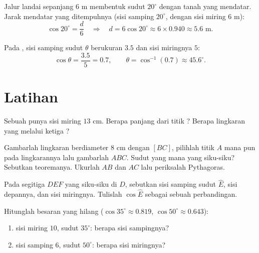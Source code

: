 \begin{example}\label{ex:g8:cosine:side}
Jalur landai sepanjang $6$ m membentuk sudut $20^\circ$ dengan tanah
yang mendatar. Jarak mendatar yang ditempuhnya (sisi samping
$20^\circ$, dengan sisi miring $6$ m):
\[
\cos 20^\circ = \frac{d}{6}
\quad\Longrightarrow\quad
d = 6 \cos 20^\circ \approx 6 \times 0.940 \approx 5.6 \text{ m}.
\]
\end{example}

\begin{example}\label{ex:g8:cosine:angle}
Pada , sisi samping sudut $\theta$ berukuran
$3.5$ dan sisi miringnya $5$:
\[
\cos\theta = \frac{3.5}{5} = 0.7,
\qquad
\theta = \cos^{-1}(0.7) \approx 45.6^\circ .
\]
\end{example}

\section{Latihan}

\begin{exercise}[$\star$]\label{exo:g8:cosine:1}
Sebuah  punya sisi miring $13$ cm. Berapa panjang
 dari titik ? Berapa  lingkaran
yang melalui ketiga ?
\end{exercise}

\begin{exercise}[$\star$]\label{exo:g8:cosine:2}
Gambarlah lingkaran berdiameter $8$ cm dengan  $[BC]$,
pilihlah titik $A$ mana pun pada lingkarannya lalu gambarlah $ABC$.
Sudut yang mana yang siku-siku? Sebutkan teoremanya. Ukurlah $AB$ dan
$AC$ lalu periksalah Pythagoras.
\end{exercise}

\begin{exercise}[$\star$]\label{exo:g8:cosine:3}
Pada segitiga $DEF$ yang siku-siku di $D$, sebutkan sisi samping
sudut $\widehat E$, sisi depannya, dan sisi miringnya. Tulislah
$\cos \widehat E$ sebagai sebuah perbandingan.
\end{exercise}

\begin{exercise}[$\star$]\label{exo:g8:cosine:4}
Hitunglah besaran yang hilang ($\cos 35^\circ \approx 0.819$,
$\cos 50^\circ \approx 0.643$):
\begin{enumerate}
  \item sisi miring $10$, sudut $35^\circ$: berapa sisi sampingnya?
  \item sisi samping $6$, sudut $50^\circ$: berapa sisi miringnya?
\end{enumerate}
\end{exercise}

